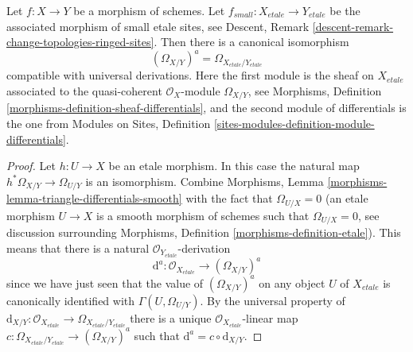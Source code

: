 \begin{lemma}
\label{lemma-match-modules-differentials}
Let $f : X \to Y$ be a morphism of schemes. Let
$f_{small} : X_{etale} \to Y_{etale}$ be the associated morphism of
small etale sites, see
Descent, Remark \ref{descent-remark-change-topologies-ringed-sites}.
Then there is a canonical isomorphism
$$
(\Omega_{X/Y})^a = \Omega_{X_{etale}/Y_{etale}}
$$
compatible with universal derivations. Here the first module
is the sheaf on $X_{etale}$ associated
to the quasi-coherent $\mathcal{O}_X$-module $\Omega_{X/Y}$, see
Morphisms, Definition \ref{morphisms-definition-sheaf-differentials},
and the second module of differentials is the one from
Modules on Sites,
Definition \ref{sites-modules-definition-module-differentials}.
\end{lemma}

\begin{proof}
Let $h : U \to X$ be an etale morphism. In this case the natural map
$h^*\Omega_{X/Y} \to \Omega_{U/Y}$ is an isomorphism. Combine
Morphisms, Lemma \ref{morphisms-lemma-triangle-differentials-smooth}
with the fact that $\Omega_{U/X} = 0$ (an etale morphism $U \to X$
is a smooth morphism of schemes such that $\Omega_{U/X} = 0$,
see discussion surrounding
Morphisms, Definition \ref{morphisms-definition-etale}).
This means that there is a natural $\mathcal{O}_{Y_{etale}}$-derivation
$$
\text{d}^a : \mathcal{O}_{X_{etale}} \longrightarrow (\Omega_{X/Y})^a
$$
since we have just seen that the value of $(\Omega_{X/Y})^a$ on any object
$U$ of $X_{etale}$ is canonically identified with $\Gamma(U, \Omega_{U/Y})$.
By the universal property of
$\text{d}_{X/Y} : \mathcal{O}_{X_{etale}} \to \Omega_{X_{etale}/Y_{etale}}$
there is a unique $\mathcal{O}_{X_{etale}}$-linear map
$c : \Omega_{X_{etale}/Y_{etale}} \to (\Omega_{X/Y})^a$ such that
$\text{d}^a = c \circ \text{d}_{X/Y}$.


\end{proof}
